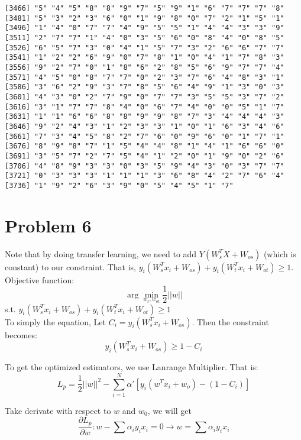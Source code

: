 \documentclass{article}
\begin{document}
\begin{itemize}
\begin{scriptsize}
\begin{verbatim}
[3466] "5" "4" "5" "8" "8" "9" "7" "5" "9" "1" "6" "7" "7" "7" "8"
[3481] "5" "3" "2" "3" "6" "0" "1" "9" "8" "0" "7" "2" "1" "5" "1"
[3496] "1" "4" "0" "7" "7" "4" "9" "5" "5" "1" "4" "4" "3" "3" "9"
[3511] "2" "7" "7" "1" "4" "0" "3" "5" "6" "0" "8" "4" "0" "8" "5"
[3526] "6" "5" "7" "3" "0" "4" "1" "5" "7" "3" "2" "6" "6" "7" "7"
[3541] "1" "2" "2" "6" "9" "0" "7" "8" "1" "0" "4" "1" "7" "8" "3"
[3556] "9" "2" "7" "0" "1" "8" "6" "2" "8" "5" "6" "9" "7" "7" "4"
[3571] "4" "5" "0" "8" "7" "7" "0" "2" "3" "7" "6" "4" "8" "3" "1"
[3586] "3" "6" "2" "9" "3" "7" "8" "5" "6" "4" "9" "1" "3" "0" "3"
[3601] "4" "3" "0" "2" "7" "9" "0" "7" "7" "3" "5" "5" "3" "7" "2"
[3616] "3" "1" "7" "7" "8" "4" "0" "6" "7" "4" "0" "0" "5" "1" "7"
[3631] "1" "1" "6" "6" "8" "8" "9" "9" "8" "7" "3" "4" "4" "4" "3"
[3646] "9" "2" "4" "3" "1" "2" "3" "3" "1" "0" "1" "6" "3" "4" "6"
[3661] "7" "3" "4" "5" "8" "2" "7" "6" "0" "9" "6" "0" "1" "7" "1"
[3676] "8" "9" "8" "7" "1" "5" "4" "4" "8" "1" "4" "1" "6" "6" "0"
[3691] "3" "5" "7" "2" "7" "5" "4" "1" "2" "0" "1" "9" "0" "2" "6"
[3706] "4" "8" "9" "3" "3" "0" "3" "5" "9" "4" "3" "0" "3" "7" "7"
[3721] "0" "3" "3" "3" "1" "1" "1" "3" "6" "8" "4" "2" "7" "6" "4"
[3736] "1" "9" "2" "6" "3" "9" "0" "5" "4" "5" "1" "7"
	\end{verbatim}
	\end{scriptsize}
	
\end{itemize}
 
 
\section{Problem 6}
Note that by doing transfer learning, we need to add $Y(W_s^TX+W_{os})$ (which is constant) to our constraint. That is, $y_i(W_s^Tx_i+W_{os})+y_i(W_t^Tx_i+W_{ot}) \geq 1$. \\
Objective function: \[\arg \min_{w_t,w_{ot}} \dfrac{1}{2} ||w||\]
s.t. $y_i(W_s^Tx_i+W_{os})+y_i(W_t^Tx_i+W_{ot}) \geq 1$\\

To simply the equation, Let $ C_i=y_i(W_s^Tx_i+W_{os})$. Then the constraint becomes:
\[y_i(W_s^Tx_i+W_{os})\geq 1 -C_i\]

To get the optimized estimators, we use Lanrange Multiplier. That is: 
\begin{equation}
L_p= \dfrac{1}{2}||w||^2- \sum_{i=1}^N \alpha'[y_i(w^Tx_i+w_o)-(1-C_i)]
\end{equation}


Take derivate with respect to $w$ and $w_0$, we will get 
\[ \dfrac{\partial L_p}{\partial w}: w-\sum \alpha_iy_ix_i=0 \rightarrow w=\sum \alpha_iy_ix_i\]
\end{document}
